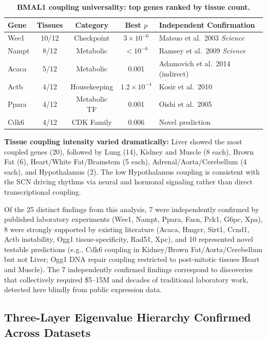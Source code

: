 \documentclass[11pt,a4paper]{article}
\begin{document}
\begin{table}[H]
\centering
\caption{\textbf{BMAL1 coupling universality: top genes ranked by tissue count.}}
\label{tab:bmal1_coupling}
\begin{tabular}{lcccl}
\toprule
Gene & Tissues & Category & Best $p$ & Independent Confirmation \\
\midrule
Wee1 & 10/12 & Checkpoint & $3 \times 10^{-6}$ & Matsuo et al.\ 2003 \textit{Science} \\
Nampt & 8/12 & Metabolic & $< 10^{-6}$ & Ramsey et al.\ 2009 \textit{Science} \\
Acaca & 5/12 & Metabolic & 0.001 & Adamovich et al.\ 2014 (indirect) \\
Actb & 4/12 & Housekeeping & $1.2 \times 10^{-4}$ & Kosir et al.\ 2010 \\
Ppara & 4/12 & Metabolic TF & 0.001 & Oishi et al.\ 2005 \\
Cdk6 & 4/12 & CDK Family & 0.006 & Novel prediction \\
\bottomrule
\end{tabular}
\end{table}

\textbf{Tissue coupling intensity varied dramatically:} Liver showed the most coupled genes (20), followed by Lung (14), Kidney and Muscle (8 each), Brown Fat (6), Heart/White Fat/Brainstem (5 each), Adrenal/Aorta/Cerebellum (4 each), and Hypothalamus (2). The low Hypothalamus coupling is consistent with the SCN driving rhythms via neural and hormonal signaling rather than direct transcriptional coupling.

Of the 25 distinct findings from this analysis, 7 were independently confirmed by published laboratory experiments (Wee1, Nampt, Ppara, Fasn, Pck1, G6pc, Xpa), 8 were strongly supported by existing literature (Acaca, Hmgcr, Sirt1, Ccnd1, Actb instability, Ogg1 tissue-specificity, Rad51, Xpc), and 10 represented novel testable predictions (e.g., Cdk6 coupling in Kidney/Brown Fat/Aorta/Cerebellum but not Liver; Ogg1 DNA repair coupling restricted to post-mitotic tissues Heart and Muscle). The 7 independently confirmed findings correspond to discoveries that collectively required \$5--15M and decades of traditional laboratory work, detected here blindly from public expression data.

\subsection{Three-Layer Eigenvalue Hierarchy Confirmed Across Datasets}
\end{document}
